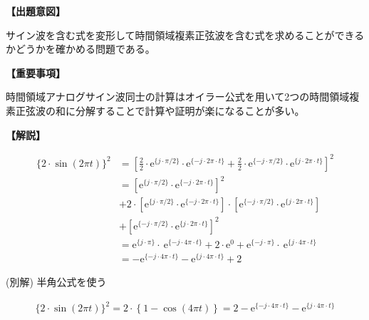 \noindent \textbf{【出題意図】}

\bigskip
\noindent サイン波を含む式を変形して時間領域複素正弦波を含む式を求めることができるかどうかを確かめる問題である。

\vspace{1em}
\noindent \textbf{【重要事項】}

\medskip
\noindent 時間領域アナログサイン波同士の計算はオイラー公式を用いて2つの時間領域複素正弦波の和に分解することで計算や証明が楽になることが多い。

\bigskip
\vspace{1em}
\noindent \textbf{【解説】}

\bigskip

\begin{align*}
\{2 \cdot \sin (2\pi t) \}^2
&=
\left [
  \frac{2}{2}\cdot\textrm{e}^{\{j \cdot \pi/2 \}}\cdot\textrm{e}^{\{-j \cdot 2\pi \cdot t \}} 
+ \frac{2}{2}\cdot\textrm{e}^{\{-j \cdot \pi/2 \}}\cdot\textrm{e}^{\{j \cdot 2\pi \cdot t \}} 
\right ]^2 \\
&=
  \left [ \textrm{e}^{\{j \cdot \pi/2 \}}\cdot\textrm{e}^{\{-j \cdot 2\pi \cdot t \}} \right ]^2 \\
&+ 2 \cdot \left [ \textrm{e}^{\{j \cdot \pi/2 \}}\cdot\textrm{e}^{\{-j \cdot 2\pi \cdot t \}} \right ]
     \cdot \left [ \textrm{e}^{\{-j \cdot \pi/2 \}}\cdot\textrm{e}^{\{j \cdot 2\pi \cdot t \}} \right ] \\
&+ \left [ \textrm{e}^{\{-j \cdot \pi/2 \}}\cdot\textrm{e}^{\{j \cdot 2\pi \cdot t \}} \right ]^2 \\
&=
  \textrm{e}^{\{ j \cdot \pi \}} \cdot\ \textrm{e}^{\{-j \cdot 4\pi \cdot t \}}
+2 \cdot \textrm{e}^{0}
+ \textrm{e}^{\{-j \cdot \pi \}} \cdot\ \textrm{e}^{\{ j \cdot 4\pi \cdot t \}} \\
&=
-\textrm{e}^{\{-j \cdot 4\pi \cdot t \}}
-\textrm{e}^{\{ j \cdot 4\pi \cdot t \}}
+2
\end{align*}

\smallskip
(別解) 半角公式を使う

\begin{align*}
\{2 \cdot \sin (2\pi t) \}^2 
= 2 \cdot \left \{ 1-\cos( 4 \pi t) \right  \}
= 2 -\textrm{e}^{\{-j \cdot 4\pi \cdot t \}} -\textrm{e}^{\{ j \cdot 4\pi \cdot t \}}
\end{align*}
